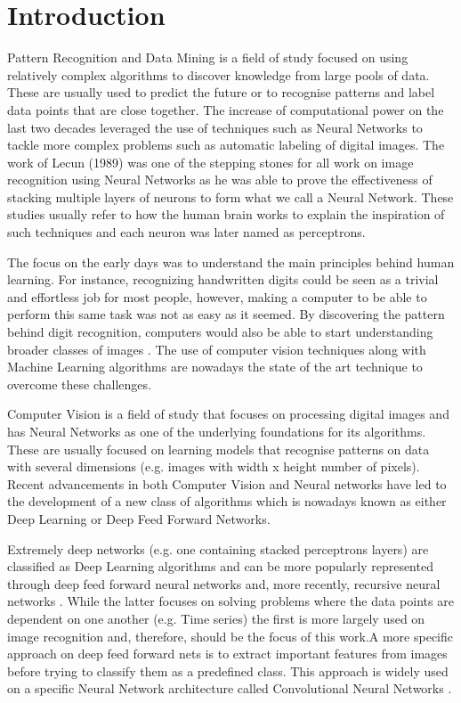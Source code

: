 \chapter{Introduction}
Pattern Recognition and Data Mining is a field of study focused on using relatively complex algorithms to discover knowledge from large pools of data. These are usually used to predict the future or to recognise patterns and label data points that are close together. The increase of computational power on the last two decades leveraged the use of techniques such as Neural Networks \cite{bishop1995neural} to tackle more complex problems such as automatic labeling of digital images. The work of Lecun (1989) \cite{lecunn89} was one of the stepping stones for all work on image recognition using Neural Networks as he was able to prove the effectiveness of stacking multiple layers of neurons to form what we call a Neural Network. These studies usually refer to how the human brain works to explain the inspiration of such techniques and each neuron was later named as perceptrons.

The focus on the early days was to understand the main principles behind human learning. For instance, recognizing handwritten digits could be seen as a trivial and effortless job for most people, however, making a computer to be able to perform this same task was not as easy as it seemed. By discovering the pattern behind digit recognition, computers would also be able to start understanding broader classes of images \cite{krizhevsky2012}. The use of computer vision techniques along with Machine Learning algorithms are nowadays the state of the art technique to overcome these challenges.

Computer Vision is a field of study that focuses on processing digital images and has Neural Networks as one of the underlying foundations for its algorithms. These are usually  focused on learning models that recognise patterns on data with several dimensions (e.g. images with width x height number of pixels). Recent advancements in both Computer Vision and Neural networks have led to the development of a new class of algorithms which is nowadays known as either Deep Learning or Deep Feed Forward Networks.

Extremely deep networks (e.g. one containing stacked perceptrons layers) are classified as Deep Learning algorithms and can be more popularly represented through deep feed forward neural networks \cite{hornik1989multilayer} and, more recently, recursive neural networks \cite{goller1996learning}. While the latter focuses on solving problems where the data points are dependent on one another (e.g. Time series) the first is more largely used on image recognition and, therefore, should be the focus of this work.A more specific approach on deep feed forward nets is to extract important features from images before trying to classify them as a predefined class. This approach is widely used on a specific Neural Network architecture called Convolutional Neural Networks \cite{matsugu2003subject}.

